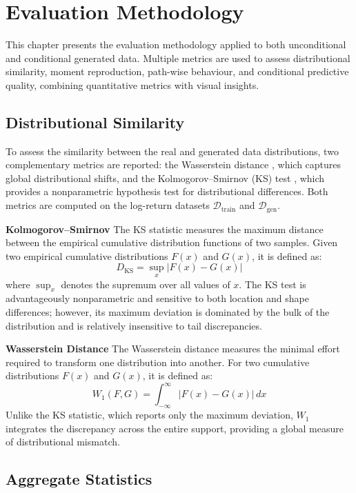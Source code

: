 \chapter{Evaluation Methodology}
\label{ch:evaluation_methodology}
This chapter presents the evaluation methodology applied to both unconditional and
conditional generated data. Multiple metrics are used to assess distributional similarity,
moment reproduction, path-wise behaviour, and conditional predictive quality, combining
quantitative metrics with visual insights.

\section{Distributional Similarity}

To assess the similarity between the real and generated data distributions, two
complementary metrics are reported: the Wasserstein distance \cite{arjovsky2017wasserstein},
which captures global distributional shifts, and the Kolmogorov--Smirnov (KS) test
\cite{massey1951kolmogorov}, which provides a nonparametric hypothesis test for
distributional differences. Both metrics are computed on the log-return datasets
\(\mathcal{D}_{\text{train}}\) and \(\mathcal{D}_{\text{gen}}\).

\textbf{Kolmogorov--Smirnov} \quad The KS statistic measures the maximum distance between
the empirical cumulative distribution functions of two samples. Given two empirical
cumulative distributions \(F(x)\) and \(G(x)\), it is defined as:
\[
    D_{\text{KS}} = \sup_x |F(x) - G(x)|
\]
where \(\sup_x\) denotes the supremum over all values of \(x\). The KS test is
advantageously nonparametric and sensitive to both location and shape differences;
however, its maximum deviation is dominated by the bulk of the distribution and is
relatively insensitive to tail discrepancies.

\textbf{Wasserstein Distance} \quad The Wasserstein distance measures the minimal effort
required to transform one distribution into another. For two cumulative distributions
\(F(x)\) and \(G(x)\), it is defined as:
\[
    W_1(F, G) = \int_{-\infty}^{\infty} |F(x) - G(x)|\, dx
\]
Unlike the KS statistic, which reports only the maximum deviation, \(W_1\) integrates
the discrepancy across the entire support, providing a global measure of distributional
mismatch.

\section{Aggregate Statistics}


